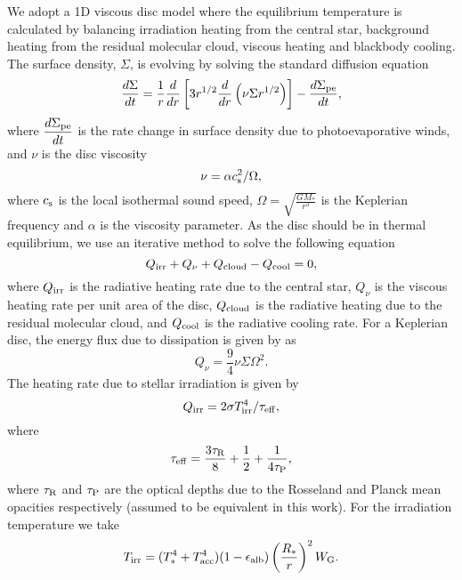 \documentclass[a4paper,fleqn,usenatbib]{mnras}
\begin{document}
We adopt a 1D viscous disc model where the equilibrium temperature is calculated by balancing irradiation heating from the central star, background heating from the residual molecular cloud, viscous heating and blackbody cooling.
The surface density, $\Sigma$, is evolving by solving the standard diffusion equation
\begin{equation}
\dfrac{d\Sigma}{dt}=\frac{1}{r}\dfrac{d}{dr}\left[3r^{1/2}\dfrac{d}{dr}\left(\nu\Sigma r^{1/2}\right)\right]-\dfrac{d\Sigma_{\rm pe}}{dt},
\end{equation}
where $\dfrac{d\Sigma_{\rm pe}}{dt}$ is the rate change in surface density due to photoevaporative winds, and $\nu$ is the disc viscosity \citep{Shak}
\begin{equation}
\nu=\alpha c_{\rm s}^2/\Omega,
\end{equation}
where $c_{\rm s}$ is the local isothermal sound speed, $\Omega = \sqrt{\frac{GM_*}{r^3}}$ is the Keplerian frequency and $\alpha$ is the viscosity parameter.
As the disc should be in thermal equilibrium, we use an iterative method to solve the following equation \citet{Dangelo12}
\begin{equation}
Q_{\rm irr} + Q_{\nu} + Q_{\rm cloud} - Q_{\rm cool} = 0,
\end{equation}
where $Q_{\rm irr}$ is the radiative heating rate due to the central star, $Q_{\nu}$ is the viscous heating rate per unit area of the disc, $Q_{\rm cloud}$ is the radiative heating due to the residual molecular cloud, and $Q_{\rm cool}$ is the radiative cooling rate.
For a Keplerian disc, the energy flux due to dissipation is given by \citet{Mihalas} as
\begin{equation}
Q_{\nu} = \frac{9}{4}\nu\Sigma\Omega^2.    
\end{equation}
The heating rate due to stellar irradiation is given by \citet{Menou}
\begin{equation}
Q_{\rm irr}=2\sigma T_{\rm irr}^4/\tau_{\rm eff}, 
\end{equation}
where
\begin{equation}
\tau_{\rm eff} = \frac{3\tau_{\rm R}}{8}+\frac{1}{2}+\frac{1}{4\tau_{\rm P}},
\end{equation}
where $\tau_{\rm R}$ and $\tau_{\rm P}$ are the optical depths due to the Rosseland and Planck mean opacities respectively (assumed to be equivalent in this work).
For the irradiation temperature we take
\begin{equation}
T_{\rm irr}=(T_{*}^4+T_{\rm acc}^4)(1-\epsilon_{\rm alb})\left(\frac{R_*}{r}\right)^2 W_{\rm G}.
\end{equation}
\end{document}
